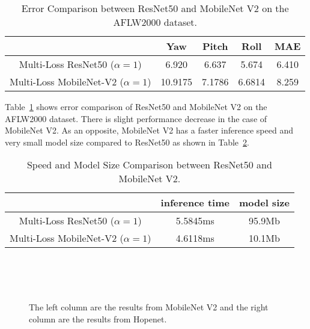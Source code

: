 \documentclass[letterpaper, 10 pt, conference]{ieeeconf}  %
\begin{document}
\begin{table}[h]
	\caption{Error Comparison between ResNet50 and MobileNet V2 on the AFLW2000 dataset.}
	\label{tb:table_error_compare}
	\begin{center}
		\begin{tabular}{|c|c|c|c|c|}
			\hline
			 & Yaw & Pitch & Roll & MAE \\
			\hline
			Multi-Loss ResNet50 ($\alpha = 1$) & 6.920 & 6.637 & 5.674 & 6.410 \\
			\hline
			Multi-Loss MobileNet-V2 ($\alpha = 1$) & 10.9175 & 7.1786 & 6.6814 &  8.259 \\
			\hline
		\end{tabular}
	\end{center}
\end{table}

Table~\ref{tb:table_error_compare} shows error comparison of ResNet50 and MobileNet V2 on the AFLW2000 dataset. There is slight performance decrease in the case of MobileNet V2. As an opposite, MobileNet V2 has a faster inference speed and very small model size compared to ResNet50 as shown in Table~\ref{tb:table_compare2}.

\begin{table}[h]
	\caption{Speed and Model Size Comparison between ResNet50 and MobileNet V2.}
	\label{tb:table_compare2}
	\begin{center}
		\begin{tabular}{|c|c|c|}
			\hline
			& inference time & model size \\
			\hline
			Multi-Loss ResNet50 ($\alpha = 1$) & 5.5845ms & 95.9Mb \\
			\hline
			Multi-Loss MobileNet-V2 ($\alpha = 1$) & 4.6118ms & 10.1Mb \\
			\hline
		\end{tabular}
	\end{center}
\end{table}

\begin{figure}[ht]
	\centering
	 \hspace*{0.5cm} 
	 \\
	 \hspace*{0.5cm}
	 \\
	 \hspace*{0.5cm}
	 \\
	\caption{The left column are the results from MobileNet V2 and the right column are the results from Hopenet.}
	\label{fig:result_images}
\end{figure}
\end{document}
